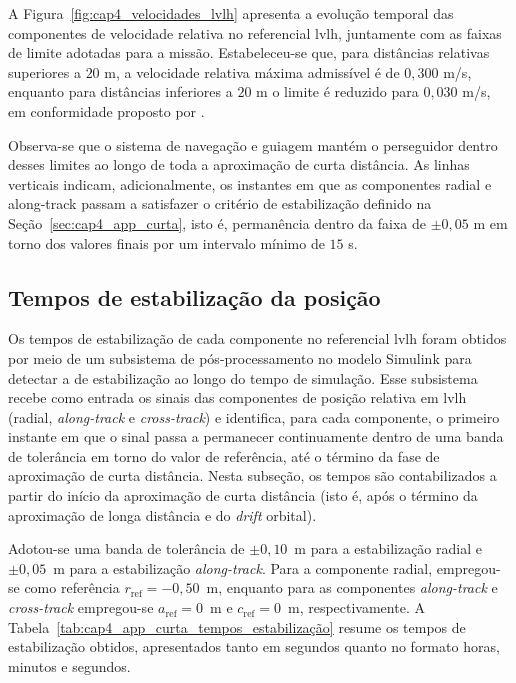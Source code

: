 A Figura~\ref{fig:cap4_velocidades_lvlh} apresenta a evolução temporal das componentes de velocidade relativa no referencial \gls{lvlh}{,} juntamente com as faixas de limite adotadas para a missão. Estabeleceu-se que{,} para distâncias relativas superiores a $20$ m{,} a velocidade relativa máxima admissível é de $0{,}300$ m/s{,} enquanto para distâncias inferiores a $20$ m o limite é reduzido para $0{,}030$ m/s{,} em conformidade proposto por \cite{vedant2025longrange,mathworks_space_rendezvous_docking}.

Observa-se que o sistema de navegação e guiagem mantém o perseguidor dentro desses limites ao longo de toda a aproximação de curta distância. As linhas verticais indicam{,} adicionalmente{,} os instantes em que as componentes radial e along-track passam a satisfazer o critério de estabilização definido na Seção~\ref{sec:cap4_app_curta}{,} isto é{,} permanência dentro da faixa de $\pm 0{,}05$ m em torno dos valores finais por um intervalo mínimo de $15$ s.

\subsection{Tempos de estabilização da posição}

Os tempos de estabilização de cada componente no referencial \gls{lvlh} foram obtidos por meio de um subsistema de pós-processamento no modelo Simulink para detectar a de estabilização ao longo do tempo de simulação.
Esse subsistema recebe como entrada os sinais das componentes de posição relativa em \gls{lvlh} (radial, \emph{along-track} e \emph{cross-track}) e identifica, para cada componente, o primeiro instante em que o sinal passa a permanecer continuamente dentro de uma banda de tolerância em torno do valor de referência, até o término da fase de aproximação de curta distância. Nesta subseção, os tempos são contabilizados a partir do início da aproximação de curta distância (isto é, após o término da aproximação de longa distância e do \emph{drift} orbital).

Adotou-se uma banda de tolerância de $\pm 0{,}10$~m para a estabilização radial e $\pm 0{,}05$~m para a estabilização \emph{along-track}.
Para a componente radial, empregou-se como referência $r_{\mathrm{ref}}=-0{,}50$~m, enquanto para as componentes \emph{along-track} e \emph{cross-track} empregou-se $a_{\mathrm{ref}}=0$~m e $c_{\mathrm{ref}}=0$~m, respectivamente.
A Tabela~\ref{tab:cap4_app_curta_tempos_estabilização} resume os tempos de estabilização obtidos, apresentados tanto em segundos quanto no formato horas, minutos e segundos.

